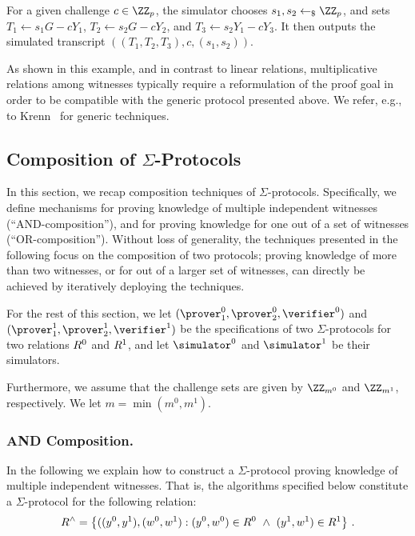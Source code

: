 \documentclass[runningheads]{llncs}
\begin{document}
For a given challenge $c\in\ZZ_p$, the simulator chooses $s_1,s_2\getsr\ZZ_p$, and sets $T_1\gets s_1G -cY_1$, $T_2\gets s_2G-cY_2$, and $T_3\gets s_2Y_1-cY_3$.
It then outputs the simulated transcript $((T_1,T_2,T_3),c,(s_1,s_2))$.

As shown in this example, and in contrast to linear relations, multiplicative relations among witnesses typically require a reformulation of the proof goal in order to be compatible with the generic protocol presented above.
We refer, e.g., to Krenn~\cite{krenn12} for generic techniques. 

\subsection{Composition of $\Sigma$-Protocols}
  In this section, we recap composition techniques of $\Sigma$-protocols.
  Specifically, we define mechanisms for proving knowledge of multiple independent witnesses (``AND-composition''), and for proving knowledge for one out of a set of witnesses (``OR-composition'').
  Without loss of generality, the techniques presented in the following focus on the composition of two protocols;
  proving knowledge of more than two witnesses, or for out of a larger set of witnesses, can directly be achieved by iteratively deploying the techniques.

  For the rest of this section, we let $(\prover_1^0,\prover_2^0,\verifier^0)$ and $(\prover_1^1,\prover_2^1,\verifier^1)$ be the specifications of two $\Sigma$-protocols for two relations $R^0$ and $R^1$, and let $\simulator^0$ and $\simulator^1$ be their simulators.

  Furthermore, we assume that the challenge sets are given by $\ZZ_{m^0}$ and $\ZZ_{m^1}$, respectively.
  We let $m=\min(m^0,m^1)$.


\subsubsection{AND Composition.}
  In the following we explain how to construct a $\Sigma$-protocol proving knowledge of multiple independent witnesses.
  That is, the algorithms specified below constitute a $\Sigma$-protocol for the following relation:
$$
  R^\land = \left\{ ((y^0,y^1),(w^0,w^1) : (y^0,w^0)\in R^0 ~\land~ (y^1,w^1)\in R^1\right\}\,.
$$
\end{document}
